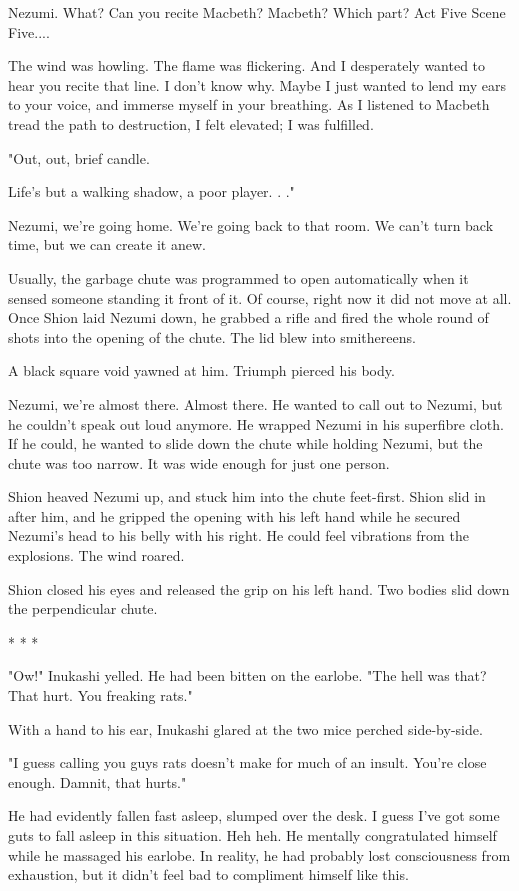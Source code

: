 Nezumi. What? Can you recite Macbeth? Macbeth? Which part? Act Five
Scene Five....

The wind was howling. The flame was flickering. And I desperately wanted
to hear you recite that line. I don't know why. Maybe I just wanted to
lend my ears to your voice, and immerse myself in your breathing. As I
listened to Macbeth tread the path to destruction, I felt elevated; I
was fulfilled.

"Out, out, brief candle.

Life's but a walking shadow, a poor player. . ."

Nezumi, we're going home. We're going back to that room. We can't turn
back time, but we can create it anew.

Usually, the garbage chute was programmed to open automatically when it
sensed someone standing it front of it. Of course, right now it did not
move at all. Once Shion laid Nezumi down, he grabbed a rifle and fired
the whole round of shots into the opening of the chute. The lid blew
into smithereens.

A black square void yawned at him. Triumph pierced his body.

Nezumi, we're almost there. Almost there. He wanted to call out to
Nezumi, but he couldn't speak out loud anymore. He wrapped Nezumi in his
superfibre cloth. If he could, he wanted to slide down the chute while
holding Nezumi, but the chute was too narrow. It was wide enough for
just one person.

Shion heaved Nezumi up, and stuck him into the chute feet-first. Shion
slid in after him, and he gripped the opening with his left hand while
he secured Nezumi's head to his belly with his right. He could feel
vibrations from the explosions. The wind roared.

Shion closed his eyes and released the grip on his left hand. Two bodies
slid down the perpendicular chute.

* * *

"Ow!" Inukashi yelled. He had been bitten on the earlobe. "The hell was
that? That hurt. You freaking rats."

With a hand to his ear, Inukashi glared at the two mice perched
side-by-side.

"I guess calling you guys rats doesn't make for much of an insult.
You're close enough. Damnit, that hurts."

He had evidently fallen fast asleep, slumped over the desk. I guess I've
got some guts to fall asleep in this situation. Heh heh. He mentally
congratulated himself while he massaged his earlobe. In reality, he had
probably lost consciousness from exhaustion, but it didn't feel bad to
compliment himself like this.

